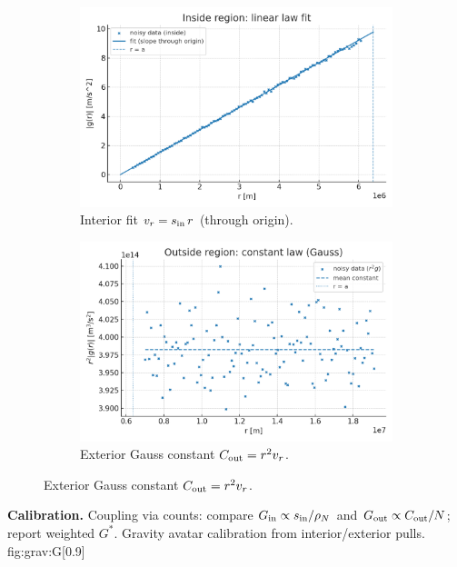 \documentclass[12pt,a4paper,oneside]{scrreprt}
\def\;{}%
\begin{document}
\begin{figure}[htbp]
  \vspace{0.6em}
  \begin{subfigure}[t]{0.49\linewidth}
    \includegraphics[width=\linewidth]{gravity_inside_fit.png}
    \caption{Interior fit $\;v_r=s_{\rm in}\,r\;$ (through origin).}
    \label{fig:grav:inside}
  \end{subfigure}\hfill
  \begin{subfigure}[t]{0.49\linewidth}
    \includegraphics[width=\linewidth]{gravity_outside_constant.png}
    \caption{Exterior Gauss constant $C_{\rm out}=r^2 v_r$.}
    \label{fig:grav:cout}
  \end{subfigure}
\end{figure}

\noindent\textbf{Calibration.} Coupling via counts: compare $G_{\rm in}\propto s_{\rm in}/\rho_N$ and $G_{\rm out}\propto C_{\rm out}/N$; report weighted $G^*$.
       {Gravity avatar calibration from interior/exterior pulls.}
       {fig:grav:G}[0.9]
\end{document}
